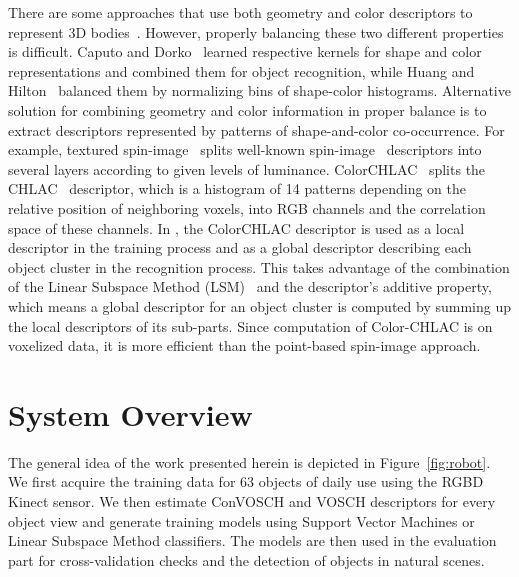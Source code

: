 \documentclass[conference]{sty/IEEEtran}
\begin{document}
There are some approaches that use both geometry and color descriptors to
represent 3D bodies~\cite{park2006}. However, properly balancing these two
different properties is difficult.  Caputo and Dorko~\cite{caputo2002} learned
respective kernels for shape and color representations and combined them for
object recognition, while Huang and Hilton~\cite{huang2009} balanced them by
normalizing bins of shape-color histograms.  Alternative solution for combining
geometry and color information in proper balance is to extract descriptors
represented by patterns of shape-and-color co-occurrence.  For example, textured
spin-image~\cite{cortelazzo2006} splits well-known
spin-image~\cite{Johnson_spin_images} descriptors into several layers
according to given levels of luminance. ColorCHLAC~\cite{kanezaki2010icra} 
splits the CHLAC~\cite{kobayashi2004} descriptor, which is a histogram of 14 patterns 
depending on the relative position of neighboring voxels, into RGB channels and the correlation 
space of these channels.  In \cite{kanezaki2010icra}, the ColorCHLAC descriptor is used as a local
descriptor in the training process and as a global descriptor describing each
object cluster in the recognition process. This takes advantage of the combination
of the Linear Subspace Method (LSM)~\cite{watanabe1973} and the descriptor's additive property, 
which means a global descriptor for an object cluster is computed by summing up the local descriptors of its sub-parts.
Since computation of Color-CHLAC is on voxelized data, it is more efficient
than the point-based spin-image approach.

\section{System Overview}
\label{sec:overview}
The general idea of the work presented herein is depicted in 
Figure~\ref{fig:robot}. We first acquire the training data for 63 objects
of daily use using the RGBD Kinect sensor. We then estimate ConVOSCH and VOSCH descriptors 
for every object view and generate training models using Support Vector
Machines or Linear Subspace Method classifiers. The models are then used
in the evaluation part for cross-validation checks and the detection of 
objects in natural scenes.
\end{document}
